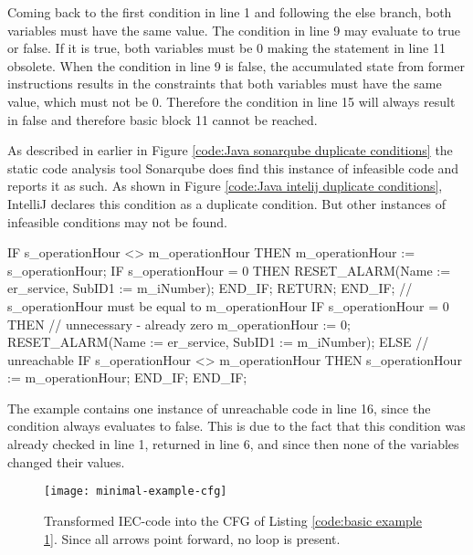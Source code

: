 Coming back to the first condition in line 1 and following the else branch, both variables must have the same value. The condition in line 9 may evaluate to true or false. If it is true, both variables must be 0 making the statement in line 11 obsolete. When the condition in line 9 is false, the accumulated state from former instructions results in the constraints that both variables must have the same value, which must not be 0. Therefore the condition in line 15 will always result in false and therefore basic block 11 cannot be reached. 

As described in earlier in Figure \ref{code:Java sonarqube duplicate conditions} the static code analysis tool Sonarqube \cite{sonarqube} does find this instance of infeasible code and reports it as such. As shown in Figure \ref{code:Java intelij duplicate conditions}, IntelliJ \cite{IntelliJIDEACapable} declares this condition as a duplicate condition. But other instances of infeasible conditions may not be found. 




\begin{program}[h!]
	\begin{GenericCode}
IF s_operationHour <> m_operationHour THEN
	m_operationHour := s_operationHour;
	IF s_operationHour = 0 THEN
		RESET_ALARM(Name := er_service, SubID1 := m_iNumber);
	END_IF;
	RETURN;
END_IF;
// s_operationHour must be equal to m_operationHour
IF s_operationHour = 0 THEN
	// unnecessary - already zero
	m_operationHour := 0;
	RESET_ALARM(Name := er_service, SubID1 := m_iNumber);
ELSE
	// unreachable
	IF s_operationHour <> m_operationHour THEN
		s_operationHour := m_operationHour;
	END_IF;
END_IF;
	\end{GenericCode}
	\caption{The example contains one instance of unreachable code in line 16, since the condition always evaluates to false. This is due to the fact that this condition was already checked in line 1, returned in line 6, and since then none of the variables changed their values.}
	\label{code:basic example 1}
\end{program}

\begin{figure}[h!]
	\centering
	\texttt{[image: minimal-example-cfg]}
	\caption{Transformed IEC-code into the CFG of Listing \ref{code:basic example 1}. Since all arrows point forward, no loop is present.}
	\label{fig:basic example 1 cfg}
\end{figure}

